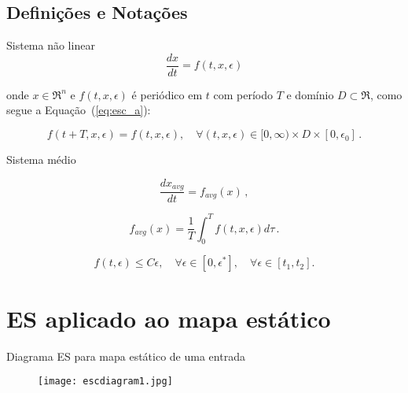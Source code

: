 \documentclass{beamer}
\begin{document}
\subsection{Definições e Notações}
\begin{frame}
\begin{block}{Sistema não linear}
	\begin{equation}
        \frac{dx}{dt} = f(t,x,\epsilon)
	\end{equation}
\end{block}
\begin{block}{}
onde $x \in  \Re^n$ e $f(t,x,\epsilon)$ é periódico em $t$ com período $T$ e domínio $D\subset\Re$, como segue a Equação~(\ref{eq:esc_a}):
\end{block}
\begin{block}{}
\begin{equation}
\label{eq:esc_a}
f(t + T, x,\epsilon ) = f(t, x, \epsilon), \quad \forall (t, x, \epsilon) \in [0, \infty) \times D \times [0, \epsilon_0 ]\,.
\end{equation}
\end{block}
\end{frame}


\begin{frame}{Sistema médio}
	\begin{block}{}
\begin{equation}
\label{eq:esc_b}
\frac{dx_{avg}}{dt} = f_{avg}(x)\,,
\end{equation}
	\end{block}
	\begin{block}{}
\begin{equation}
\label{eq:esc_c}
 f_{avg}(x) = \frac{1}{T} \int_{0}^{T} f(t,x,\epsilon)d\tau\,.
\end{equation}
	\end{block}
	\begin{block}{}
\begin{equation}
\label{eq:esc_d}
f(t,\epsilon)   \leq  C\epsilon, \quad \forall \epsilon \in [0, \epsilon^{\ast} ], \quad \forall \epsilon \in [t_1 , t_2 ].
\end{equation}
	\end{block}
\end{frame}

\section{ES aplicado ao mapa estático}

\begin{frame}
	\begin{block}{Diagrama ES para mapa estático de uma entrada}
\begin{figure}[ht]
\begin{center}
\texttt{[image: escdiagram1.jpg]}
\end{center}
\end{figure}
        \end{block}

\end{frame}
\end{document}
